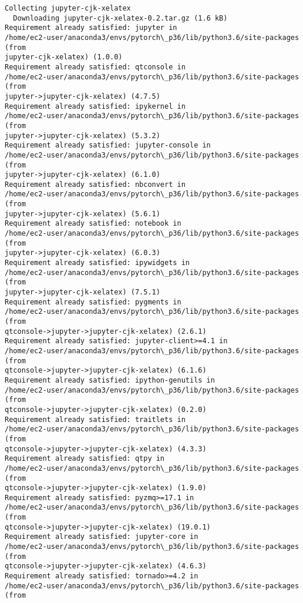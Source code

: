 \documentclass[11pt]{article}
\begin{document}
    \begin{Verbatim}[commandchars=\\\{\}]
Collecting jupyter-cjk-xelatex
  Downloading jupyter-cjk-xelatex-0.2.tar.gz (1.6 kB)
Requirement already satisfied: jupyter in
/home/ec2-user/anaconda3/envs/pytorch\_p36/lib/python3.6/site-packages (from
jupyter-cjk-xelatex) (1.0.0)
Requirement already satisfied: qtconsole in
/home/ec2-user/anaconda3/envs/pytorch\_p36/lib/python3.6/site-packages (from
jupyter->jupyter-cjk-xelatex) (4.7.5)
Requirement already satisfied: ipykernel in
/home/ec2-user/anaconda3/envs/pytorch\_p36/lib/python3.6/site-packages (from
jupyter->jupyter-cjk-xelatex) (5.3.2)
Requirement already satisfied: jupyter-console in
/home/ec2-user/anaconda3/envs/pytorch\_p36/lib/python3.6/site-packages (from
jupyter->jupyter-cjk-xelatex) (6.1.0)
Requirement already satisfied: nbconvert in
/home/ec2-user/anaconda3/envs/pytorch\_p36/lib/python3.6/site-packages (from
jupyter->jupyter-cjk-xelatex) (5.6.1)
Requirement already satisfied: notebook in
/home/ec2-user/anaconda3/envs/pytorch\_p36/lib/python3.6/site-packages (from
jupyter->jupyter-cjk-xelatex) (6.0.3)
Requirement already satisfied: ipywidgets in
/home/ec2-user/anaconda3/envs/pytorch\_p36/lib/python3.6/site-packages (from
jupyter->jupyter-cjk-xelatex) (7.5.1)
Requirement already satisfied: pygments in
/home/ec2-user/anaconda3/envs/pytorch\_p36/lib/python3.6/site-packages (from
qtconsole->jupyter->jupyter-cjk-xelatex) (2.6.1)
Requirement already satisfied: jupyter-client>=4.1 in
/home/ec2-user/anaconda3/envs/pytorch\_p36/lib/python3.6/site-packages (from
qtconsole->jupyter->jupyter-cjk-xelatex) (6.1.6)
Requirement already satisfied: ipython-genutils in
/home/ec2-user/anaconda3/envs/pytorch\_p36/lib/python3.6/site-packages (from
qtconsole->jupyter->jupyter-cjk-xelatex) (0.2.0)
Requirement already satisfied: traitlets in
/home/ec2-user/anaconda3/envs/pytorch\_p36/lib/python3.6/site-packages (from
qtconsole->jupyter->jupyter-cjk-xelatex) (4.3.3)
Requirement already satisfied: qtpy in
/home/ec2-user/anaconda3/envs/pytorch\_p36/lib/python3.6/site-packages (from
qtconsole->jupyter->jupyter-cjk-xelatex) (1.9.0)
Requirement already satisfied: pyzmq>=17.1 in
/home/ec2-user/anaconda3/envs/pytorch\_p36/lib/python3.6/site-packages (from
qtconsole->jupyter->jupyter-cjk-xelatex) (19.0.1)
Requirement already satisfied: jupyter-core in
/home/ec2-user/anaconda3/envs/pytorch\_p36/lib/python3.6/site-packages (from
qtconsole->jupyter->jupyter-cjk-xelatex) (4.6.3)
Requirement already satisfied: tornado>=4.2 in
/home/ec2-user/anaconda3/envs/pytorch\_p36/lib/python3.6/site-packages (from

\end{Verbatim}
\end{document}
